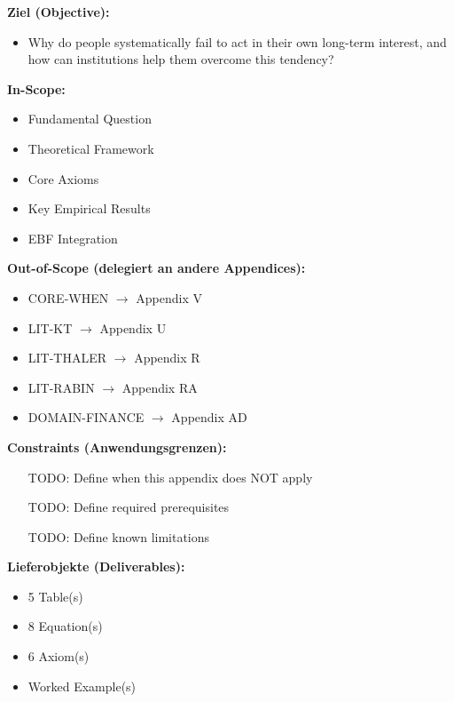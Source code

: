 \begin{tcolorbox}[
    colback=orange!5!white,
    colframe=orange!75!black,
    title={\textbf{Appendix Scope: Ziel / In-Scope / Out-of-Scope / Constraints}},
    fonttitle=\bfseries
]

\textbf{Ziel (Objective):}
\begin{itemize}[nosep]
    \item Why do people systematically fail to act in their own long-term interest, and how can institutions help them overcome this tendency?
\end{itemize}

\textbf{In-Scope:}
\begin{itemize}[nosep]
    \item Fundamental Question
    \item Theoretical Framework
    \item Core Axioms
    \item Key Empirical Results
    \item EBF Integration
\end{itemize}

\textbf{Out-of-Scope (delegiert an andere Appendices):}
\begin{itemize}[nosep]
    \item CORE-WHEN $\rightarrow$ Appendix V
    \item LIT-KT $\rightarrow$ Appendix U
    \item LIT-THALER $\rightarrow$ Appendix R
    \item LIT-RABIN $\rightarrow$ Appendix RA
    \item DOMAIN-FINANCE $\rightarrow$ Appendix AD
\end{itemize}

\textbf{Constraints (Anwendungsgrenzen):}
\begin{itemize}[nosep]
    \item [TODO: Define when this appendix does NOT apply]
    \item [TODO: Define required prerequisites]
    \item [TODO: Define known limitations]
\end{itemize}

\textbf{Lieferobjekte (Deliverables):}
\begin{itemize}[nosep]
    \item 5 Table(s)
    \item 8 Equation(s)
    \item 6 Axiom(s)
    \item Worked Example(s)
\end{itemize}

\end{tcolorbox}



